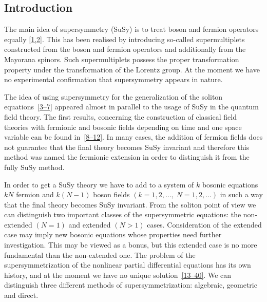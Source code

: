 { %

\newcommand{\bos}{\mathbf{bos}}
\newcommand{\fer}{\mathbf{fer}}
\newcommand{\fun}{\mathbf{fun}}
\newcommand{\gras}{\mathbf{gras}}
\newcommand{\axp}{\mathbf{axp}}
\newcommand{\der}{\mathbf{der}}
\newcommand{\del}{\mathbf{del}}
\newcommand{\pr}{\mathbf{pr}}
\newcommand{\pg}{\mathbf{pg}}
\renewcommand{\d}{\mathbf{d}}

\subsection{Introduction}

The main idea of supersymmetry (SuSy) is to treat boson and fermion
operators equally \hyperref[susy2-bib]{[1,2]}.  This has been realised
by introducing so-called supermultiplets constructed from the boson
and fermion operators and additionally from the Mayorana spinors.
Such supermultiplets possess the proper transformation property under
the transformation of the Lorentz group.  At the moment we have no
experimental confirmation that supersymmetry appears in nature.

The idea of using supersymmetry for the generalization of the soliton
equations~\hyperref[susy2-bib]{[3--7]} appeared almost in parallel to
the usage of SuSy in the quantum field theory.  The first results,
concerning the construction of classical field theories with fermionic
and bosonic fields depending on time and one space variable can be
found in~\hyperref[susy2-bib]{[8--12]}.  In many cases, the addition
of fermion fields does not guarantee that the final theory becomes
SuSy invariant and therefore this method was named the fermionic
extension in order to distinguish it from the fully SuSy method.

In order to get a SuSy theory we have to add to a system of $k$
bosonic equations $kN$ fermion and $k(N-1)$ boson fields
$(k=1,2,\ldots,\;N=1,2,\ldots)$ in such a way that the final theory
becomes SuSy invariant.  From the soliton point of view we can
distinguish two important classes of the supersymmetric equations: the
non-extended $(N = 1)$ and extended $(N > 1)$ cases.  Consideration of
the extended case may imply new bosonic equations whose properties
need further investigation.  This may be viewed as a bonus, but this
extended case is no more fundamental than the non-extended one.  The
problem of the supersymmetrization of the nonlinear partial
differential equations has its own history, and at the moment we have
no unique solution~\hyperref[susy2-bib]{[13--40]}.  We can distinguish
three different methods of supersymmetrization: algebraic, geometric
and direct.

}
